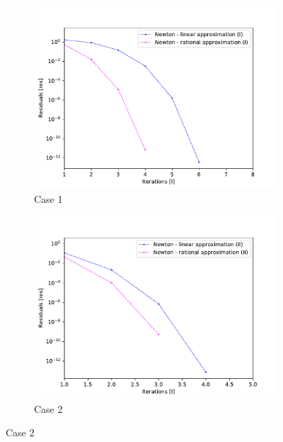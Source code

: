 \documentclass[11pt, oneside]{article}
\begin{document}
	\begin{figure}
		\centering
		\begin{subfigure}[b]{.45\linewidth}
			\includegraphics[width=\linewidth]{figure/1.pdf}
			\caption{Case 1}
		\end{subfigure}
		\begin{subfigure}[b]{.45\linewidth}
			\includegraphics[width=\linewidth]{figure/2.pdf}
			\caption{Case 2}
		\end{subfigure}
		


\end{figure}
\end{document}
